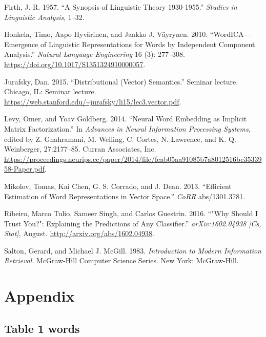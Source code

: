 \documentclass{article}
\begin{document}
\leavevmode\hypertarget{ref-firth_synopsis_1957}{}%
Firth, J. R. 1957. ``A Synopsis of Linguistic Theory 1930-1955.''
\emph{Studies in Linguistic Analysis}, 1--32.

\leavevmode\hypertarget{ref-honkela_wordicaemergence_2010}{}%
Honkela, Timo, Aapo Hyvärinen, and Jaakko J. Väyrynen. 2010.
``WordICA---Emergence of Linguistic Representations for Words by
Independent Component Analysis.'' \emph{Natural Language Engineering} 16
(3): 277--308. \url{https://doi.org/10.1017/S1351324910000057}.

\leavevmode\hypertarget{ref-jurafsky_distributional_2015}{}%
Jurafsky, Dan. 2015. ``Distributional (Vector) Semantics.'' Seminar
lecture. Chicago, IL: Seminar lecture.
\url{https://web.stanford.edu/~jurafsky/li15/lec3.vector.pdf}.

\leavevmode\hypertarget{ref-levy_neural_2014}{}%
Levy, Omer, and Yoav Goldberg. 2014. ``Neural Word Embedding as Implicit
Matrix Factorization.'' In \emph{Advances in Neural Information
Processing Systems}, edited by Z. Ghahramani, M. Welling, C. Cortes, N.
Lawrence, and K. Q. Weinberger, 27:2177--85. Curran Associates, Inc.
\url{https://proceedings.neurips.cc/paper/2014/file/feab05aa91085b7a8012516bc3533958-Paper.pdf}.

\leavevmode\hypertarget{ref-mikolov_efficient_2013}{}%
Mikolov, Tomas, Kai Chen, G. S. Corrado, and J. Dean. 2013. ``Efficient
Estimation of Word Representations in Vector Space.'' \emph{CoRR}
abs/1301.3781.

\leavevmode\hypertarget{ref-ribeiro_why_2016}{}%
Ribeiro, Marco Tulio, Sameer Singh, and Carlos Guestrin. 2016. ``"Why
Should I Trust You?": Explaining the Predictions of Any Classifier.''
\emph{arXiv:1602.04938 {[}Cs, Stat{]}}, August.
\url{http://arxiv.org/abs/1602.04938}.

\leavevmode\hypertarget{ref-salton_introduction_1983}{}%
Salton, Gerard, and Michael J. McGill. 1983. \emph{Introduction to
Modern Information Retrieval}. McGraw-Hill Computer Science Series. New
York: McGraw-Hill.

\newpage

\hypertarget{appendix}{%
\section*{Appendix}\label{appendix}}

\label{sec:appendix}

\hypertarget{table-1-words}{%
\subsection{Table 1 words}\label{table-1-words}}
\end{document}

